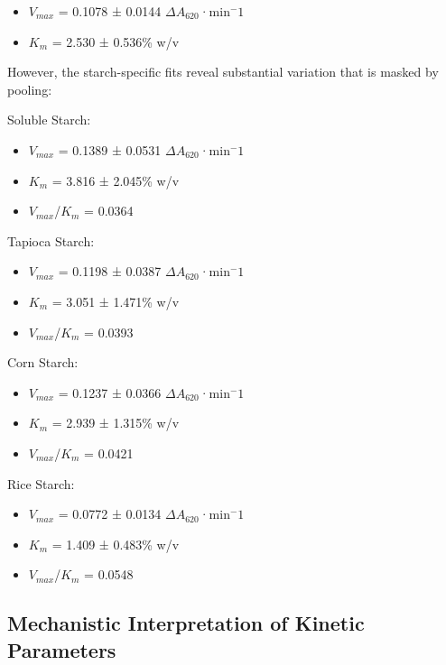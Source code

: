 \documentclass[
  12pt,
]{article}
\begin{document}
\begin{itemize}
\item
  \(V_{max}\) = 0.1078 ± 0.0144 \(\Delta A_{620}\)·min\(^-1\)
\item
  \(K_{m}\) = 2.530 ± 0.536\% w/v
\end{itemize}

However, the starch-specific fits reveal substantial variation that is
masked by pooling:

Soluble Starch:

\begin{itemize}
\item
  \(V_{max}\) = 0.1389 ± 0.0531 \(\Delta A_{620}\)·min\(^-1\)
\item
  \(K_{m}\) = 3.816 ± 2.045\% w/v
\item
  \(V_{max}\)/\(K_{m}\) = 0.0364
\end{itemize}

Tapioca Starch:

\begin{itemize}
\item
  \(V_{max}\) = 0.1198 ± 0.0387 \(\Delta A_{620}\)·min\(^-1\)
\item
  \(K_{m}\) = 3.051 ± 1.471\% w/v
\item
  \(V_{max}\)/\(K_{m}\) = 0.0393
\end{itemize}

Corn Starch:

\begin{itemize}
\item
  \(V_{max}\) = 0.1237 ± 0.0366 \(\Delta A_{620}\)·min\(^-1\)
\item
  \(K_{m}\) = 2.939 ± 1.315\% w/v
\item
  \(V_{max}\)/\(K_{m}\) = 0.0421
\end{itemize}

Rice Starch:

\begin{itemize}
\item
  \(V_{max}\) = 0.0772 ± 0.0134 \(\Delta A_{620}\)·min\(^-1\)
\item
  \(K_{m}\) = 1.409 ± 0.483\% w/v
\item
  \(V_{max}\)/\(K_{m}\) = 0.0548
\end{itemize}

\subsection{Mechanistic Interpretation of Kinetic
Parameters}\label{mechanistic-interpretation-of-kinetic-parameters}
\end{document}
